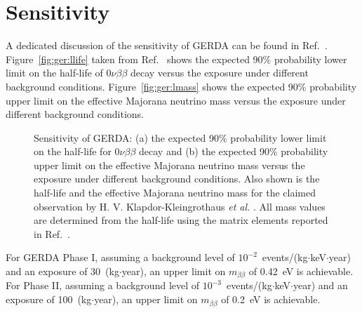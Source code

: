 \section{Sensitivity}
\label{sec:gerda:sens}
A dedicated discussion of the sensitivity of GERDA can be found in
Ref.~\cite{Cal06}. Figure~\ref{fig:ger:llife} taken from
Ref.~\cite{Cal06} shows the expected 90\% probability lower limit on
the half-life of $0\nu\beta\beta$ decay versus the exposure under
different background conditions. Figure~\ref{fig:ger:lmass} shows the
expected 90\% probability upper limit on the effective Majorana
neutrino mass versus the exposure under different background
conditions.
\begin{figure}[tbhp]
\centering
{}\hfil%
%
\caption{Sensitivity of GERDA: (a) the expected 90\% probability lower
limit on the half-life for $0\nu\beta\beta$ decay and (b) the
expected 90\% probability upper limit on the effective Majorana
neutrino mass versus the exposure under different background
conditions. Also shown is the half-life and the effective
Majorana neutrino mass for the claimed observation by
H. V. Klapdor-Kleingrothaus \textit{et al.} \cite{Hei04}. All mass
values are determined from the half-life using the matrix elements
reported in Ref.~\cite{Rod07}.}
\label{fig:gerda:limit}
\end{figure}

For GERDA Phase I, assuming a background level of
$10^{-2}$~events/(kg$\cdot$keV$\cdot$year) and an exposure of
30~(kg$\cdot$year), an upper limit on $m_{\beta\beta}$ of 0.42~eV is
achievable. For Phase II, assuming a background level of
$10^{-3}$~events/(kg$\cdot$keV$\cdot$year) and an exposure of
100~(kg$\cdot$year), an upper limit on $m_{\beta\beta}$ of 0.2~eV is
achievable.

